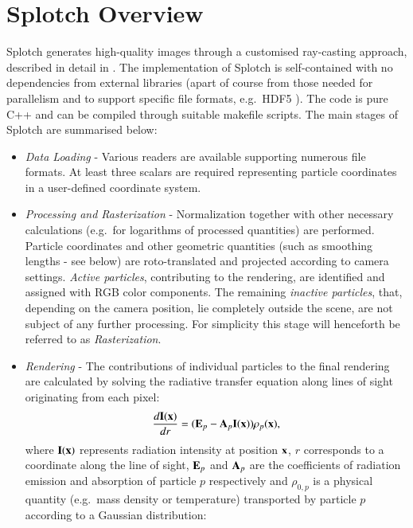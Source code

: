 \documentclass[preprint,5pt]{elsarticle}
\begin{document}
\section{Splotch Overview}
\label{sec:overview}

Splotch generates high-quality images through a customised ray-casting approach, described in detail in \cite{2008NJPh...10l5006D}.  
The implementation of Splotch is self-contained with no dependencies from external libraries (apart of course from those needed for parallelism and to support specific file formats, e.g.\ HDF5 \cite{hdf5}). The code is pure C++ and can be compiled through suitable makefile scripts.
The main stages of Splotch are summarised below:
\begin{itemize}
\item
{\it Data Loading} - Various readers are available supporting numerous file formats. At least three scalars are required representing particle coordinates in a user-defined coordinate system.
\item
{\it Processing and Rasterization} - Normalization together with other necessary 
calculations (e.g.\ for logarithms of processed quantities) are performed. Particle
coordinates and other geometric quantities (such as smoothing lengths - see below) are
roto-translated and projected according to camera settings.
{\it Active particles},  contributing to the rendering, are identified and assigned with RGB color components. The remaining
{\it inactive particles}, that, depending on the camera position, lie completely outside the scene, are not subject of any further processing.
For simplicity this stage will henceforth be referred to as {\it Rasterization}.
\item
{\it Rendering} - The contributions of individual particles to the final rendering are calculated by solving the radiative transfer equation  \cite{1991par..book.....S} along lines of sight originating from each pixel:
\begin{equation}\label{rad}
\frac{d{\bf I}{(\bf x})}{dr}=({\bf E}_p-{\bf A}_p{\bf I}({\bf x}))\rho_p({\bf x}),
\end{equation}
where ${\bf I}({\bf x})$ represents radiation intensity at position ${\bf x}$, $r$ corresponds to a coordinate along the line of sight,  ${\bf E}_p$ and ${\bf A}_p$ are the coefficients of radiation emission and absorption of particle $p$ respectively and $\rho_{0,p}$ is a physical quantity (e.g.\ mass density or temperature) transported by particle $p$ according to a Gaussian distribution:
\begin{equation}\label{kernel}

\end{equation}
\end{itemize}
\end{document}
